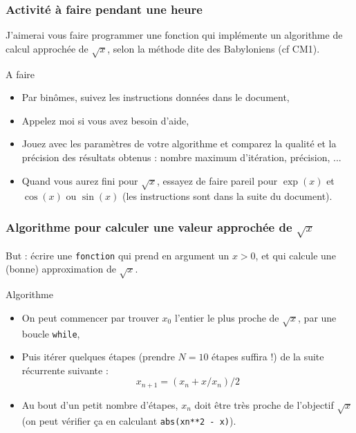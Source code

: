 \documentclass{beamer}
\newcommand{\prog}[1]{\alert{\texttt{#1}}}
\begin{document}
\frame
{
\frametitle{Activité à faire pendant une heure}

J'aimerai vous faire programmer une fonction qui implémente un algorithme de calcul approchée de $\sqrt{x}$, selon la méthode dite des Babyloniens (cf CM1).

\begin{block}{A faire}
\begin{itemize}
\item Par binômes, suivez les instructions données dans le document,
\item Appelez moi si vous avez besoin d'aide,
\item Jouez avec les paramètres de votre algorithme et comparez la qualité et la précision des résultats obtenus : nombre maximum d'itération, précision, ...
\item Quand vous aurez fini pour $\sqrt{x}$, essayez de faire pareil pour $\exp(x)$ et $\cos(x)$ ou $\sin(x)$ (les instructions sont dans la suite du document).
\end{itemize}
\end{block}
}
\frame
{
\frametitle{Algorithme pour calculer une valeur approchée de $\sqrt{x}$}

But : écrire une \prog{fonction} qui prend en argument un $x > 0$, et qui calcule une (bonne) approximation de $\sqrt{x}$.

\begin{block}{Algorithme}
\begin{itemize}
\item On peut commencer par trouver $x_0$ l'entier le plus proche de $\sqrt{x}$, par une boucle \prog{while},
\item Puis itérer quelques étapes (prendre $N=10$ étapes suffira !) de la suite récurrente suivante :
  $$x_{n+1} = (x_n + x/x_n) / 2$$
\item Au bout d'un petit nombre d'étapes, $x_n$ doit être très proche de l'objectif $\sqrt{x}$ (on peut vérifier ça en calculant \prog{abs(xn**2 - x)}).
\end{itemize}
\end{block}
}


\end{document}
